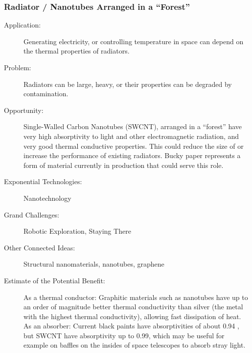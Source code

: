 \subsubsection{Radiator  / Nanotubes Arranged in a ``Forest''}
\label{thermal-materials}
\begin{description}  \item[Application:] Generating electricity, or controlling temperature  in space can depend on the thermal properties of radiators.
 
\item[Problem:] Radiators can be  large, heavy, or their properties can be degraded by contamination.
 
\item[Opportunity:] Single-Walled Carbon Nanotubes (SWCNT), arranged in a ``forest'' have very high  absorptivity to light and other electromagnetic radiation, and very good  thermal conductive properties. This could reduce the size of or  increase the performance of existing radiators. Bucky paper  \cite{Wang2008, nanolab, Wardle2008}  represents a form of material currently in production that could serve  this role.
 
\item[Exponential Technologies:]  Nanotechnology
 
\item[Grand Challenges:] Robotic  Exploration, Staying There
 
\item[Other Connected Ideas:]  Structural nanomaterials, nanotubes, graphene
 
\item[Estimate of the Potential  Benefit:] As a thermal conductor: Graphitic materials such as nanotubes  have up to an order of magnitude better thermal conductivity than silver  (the metal with the highest thermal conductivity), allowing fast  dissipation of heat. As an absorber: Current black paints have  absorptivities of about 0.94 \cite{solaracfaq}, but SWCNT have absorptivity up to  0.99, which may be useful for example on baffles on the insides of space  telescopes to absorb stray light.
 

\end{description}
